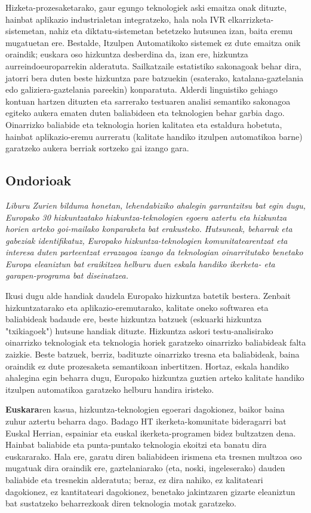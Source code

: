 \begin{multicols}{2}
    Hizketa-prozesaketarako, gaur egungo teknologiek aski emaitza onak dituzte, hainbat aplikazio industrialetan integratzeko, hala nola IVR elkarrizketa-sistemetan, nahiz eta diktatu-sistemetan betetzeko hutsunea izan, baita eremu mugatuetan ere. Bestalde, Itzulpen Automatikoko sistemek ez dute emaitza onik oraindik; euskara oso hizkuntza desberdina da, izan ere, hizkuntza aurreindoeuroparrekin alderatuta. Sailkatzaile estatistiko sakonagoak behar dira, jatorri bera duten beste hizkuntza pare batzuekin (esaterako, katalana-gaztelania edo galiziera-gaztelania pareekin) konparatuta. Alderdi linguistiko gehiago kontuan hartzen dituzten eta sarrerako testuaren analisi semantiko sakonagoa egiteko aukera ematen duten baliabideen eta teknologien behar garbia dago. Oinarrizko baliabide eta teknologia horien kalitatea eta estaldura hobetuta, hainbat aplikazio-eremu aurreratu (kalitate handiko itzulpen automatikoa barne) garatzeko aukera berriak sortzeko gai izango gara.

\subsection{Ondorioak}

\emph{Liburu Zurien bilduma honetan, lehendabiziko ahalegin garrantzitsu bat egin dugu, Europako 30 hizkuntzatako hizkuntza-teknologien egoera aztertu eta hizkuntza horien arteko goi-mailako konparaketa bat erakusteko. Hutsuneak, beharrak eta gabeziak identifikatuz, Europako hizkuntza-teknologien komunitatearentzat eta interesa duten parteentzat errazagoa izango da teknologian oinarritutako benetako Europa eleaniztun bat eraikitzea helburu duen eskala handiko ikerketa- eta garapen-programa bat diseinatzea.}

    Ikusi dugu alde handiak daudela Europako hizkuntza batetik bestera. Zenbait hizkuntzatarako eta aplikazio-eremutarako, kalitate oneko softwarea eta baliabideak badaude ere, beste hizkuntza batzuek (eskuarki hizkuntza "txikiagoek") hutsune handiak dituzte. Hizkuntza askori testu-analisirako oinarrizko teknologiak eta teknologia horiek garatzeko oinarrizko baliabideak falta zaizkie. Beste batzuek, berriz, badituzte oinarrizko tresna eta baliabideak, baina oraindik ez dute prozesaketa semantikoan inbertitzen. Hortaz, eskala handiko ahalegina egin beharra dugu, Europako hizkuntza guztien arteko kalitate handiko itzulpen automatikoa garatzeko helburu handira iristeko.

   \textbf{Euskara}ren kasua, hizkuntza-teknologien egoerari dagokionez, baikor baina zuhur aztertu beharra dago. Badago HT ikerketa-komunitate bideragarri bat Euskal Herrian, espainiar eta euskal ikerketa-programen bidez bultzatzen dena. Hainbat baliabide eta punta-puntako teknologia ekoitzi eta banatu dira euskararako. Hala ere, garatu diren baliabideen irismena eta tresnen multzoa oso mugatuak dira oraindik ere, gaztelaniarako (eta, noski, ingeleserako) dauden baliabide eta tresnekin alderatuta; beraz, ez dira nahiko, ez kalitateari dagokionez, ez kantitateari dagokionez, benetako jakintzaren gizarte eleaniztun bat sustatzeko beharrezkoak diren teknologia motak garatzeko.


\end{multicols}
